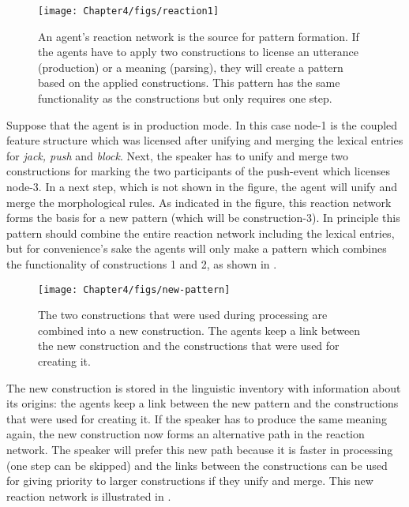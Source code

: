 \begin{figure}[htb]
\centerline{\texttt{[image: Chapter4/figs/reaction1]}}
  \caption[A reaction network as a source for pattern formation]{An agent's reaction network is the source for pattern formation. If the agents have to apply two constructions to license an utterance (production) or a meaning (parsing), they will create a pattern based on the applied constructions. This pattern has the same functionality as the constructions but only requires one step.}
   \label{f:reaction1}
\end{figure}

Suppose that the agent is in production mode. In this case node-1 is the coupled feature structure which was licensed after unifying and merging the lexical entries for {\em jack, push} and {\em block}. Next, the speaker has to unify and merge two constructions for marking the two participants of the push-event which licenses node-3. In a next step, which is not shown in the figure, the agent will unify and merge the morphological rules. As indicated in the figure, this reaction network forms the basis for a new pattern (which will be construction-3). In principle this pattern should combine the entire reaction network including the lexical entries, but for convenience's sake the agents will only make a pattern which combines the functionality of constructions 1 and 2, as shown in .
\begin{figure}[htb]
\centerline{\texttt{[image: Chapter4/figs/new-pattern]}}
  \caption[A new pattern]{The two constructions that were used during processing are combined into a new construction. The agents keep a link between the new construction and the constructions that were used for creating it.}
   \label{f:new-pattern}
\end{figure}

\newpage
The new construction is stored in the linguistic inventory with information about its origins: the agents keep a link between the new pattern and the constructions that were used for creating it. If the speaker has to produce the same meaning again, the new construction now forms an alternative path in the reaction network. The speaker will prefer this new path because it is faster in processing (one step can be skipped) and the links between the constructions can be used for giving priority to larger constructions if they unify and merge. This new reaction network is illustrated in .

